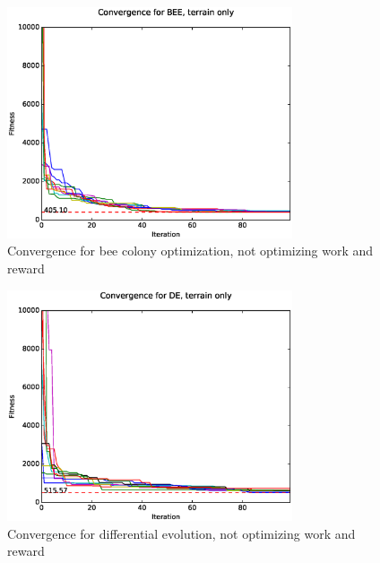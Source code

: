 \documentclass{tamuccthesis}
\begin{document}
\begin{figure}[H]
    \captionsetup{justification=centering}
    \centering
        \includegraphics[width=0.75\textwidth,trim={0cm 0.75cm 0cm 0.75cm},clip]{conv_BEE_a.eps}
    \caption[]{Convergence for bee colony optimization, not optimizing work and reward}
    \label{fig:convergence_a_BEE}
\end{figure}

\begin{figure}[H]
    \captionsetup{justification=centering}
    \centering
        \includegraphics[width=0.75\textwidth,trim={0cm 0.75cm 0cm 0.75cm},clip]{conv_DE_a.eps}
    \caption{Convergence for differential evolution, not optimizing work and reward}
    \label{fig:convergence_a_DE}
\end{figure}
\end{document}
